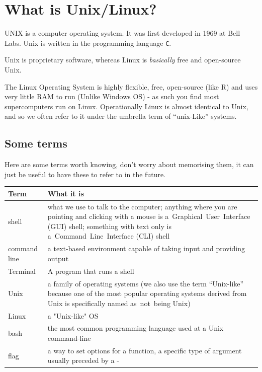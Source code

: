 \documentclass[
]{book}
\begin{document}
\hypertarget{what-is-unixlinux}{%
\section{What is Unix/Linux?}\label{what-is-unixlinux}}

UNIX is a computer operating system. It was first developed in 1969 at Bell Labs. Unix is written in the programming language \texttt{C}.

Unix is proprietary software, whereas Linux is \emph{basically} free and open-source Unix.

The Linux Operating System is highly flexible, free, open-source (like R) and uses very little RAM to run (Unlike Windows OS) - as such you find most supercomputers run on Linux. Operationally Linux is almost identical to Unix, and so we often refer to it under the umbrella term of ``unix-Like'' systems.

\hypertarget{some-terms}{%
\subsection{Some terms}\label{some-terms}}

Here are some terms worth knowing, don't worry about memorising them, it can just be useful to have these to refer to in the future.

\begin{longtable}{ll}
\toprule
\textbf{Term} & \textbf{What it is}\\
\midrule
shell & what we use to talk to the computer; anything where you are pointing and clicking with a mouse is a Graphical User Interface (GUI) shell; something with text only is a Command Line Interface (CLI) shell\\
command line & a text-based environment capable of taking input and providing output\\
Terminal & A program that runs a shell\\
Unix & a family of operating systems (we also use the term “Unix-like” because one of the most popular operating systems derived from Unix is specifically named as not being Unix)\\
Linux & a "Unix-like" OS\\
\addlinespace
bash & the most common programming language used at a Unix command-line\\
flag & a way to set options for a function, a specific type of argument usually preceded by a -\\
\bottomrule
\end{longtable}
\end{document}
